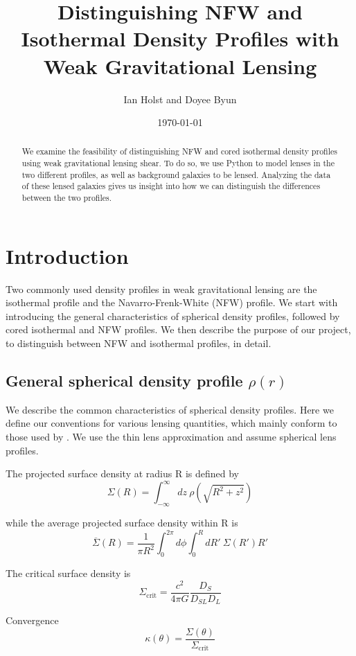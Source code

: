 \documentclass[10pt]{article}
\begin{document}
\title{Distinguishing NFW and Isothermal Density Profiles with Weak Gravitational Lensing}
\author{Ian Holst and Doyee Byun}
\date{\today}
\maketitle

\begin{abstract}
We examine the feasibility of distinguishing NFW and cored isothermal density profiles using weak gravitational lensing shear.
 To do so, we use Python to model lenses in the two different profiles, as well as background galaxies to be lensed.
 Analyzing the data of these lensed galaxies gives us insight into how we can distinguish the differences between the two profiles.
\end{abstract}

\section{Introduction}
Two commonly used density profiles in weak gravitational lensing are the isothermal profile and the Navarro-Frenk-White (NFW) profile.
We start with introducing the general characteristics of spherical density profiles, followed by cored isothermal and NFW profiles.
We then describe the purpose of our project, to distinguish between NFW and isothermal profiles, in detail.

\subsection{General spherical density profile $\rho(r)$}
We describe the common characteristics of spherical density profiles.
Here we define our conventions for various lensing quantities, which mainly conform to those used by \citet{Dodelson2017}. We use the thin lens approximation and assume spherical lens profiles.

The projected surface density at radius R is defined by
\[\Sigma(R) = \int_{-\infty}^{\infty}{dz\ \rho(\sqrt{R^2 + z^2})}\]

while the average projected surface density within R is
\[\overline{\Sigma}(R) = \frac{1}{\pi R^2} \int_0^{2\pi}{d\phi \int_0^{R}{dR'~\Sigma(R')R'}}\]

The critical surface density is
\[\Sigma_\mathrm{crit} = \frac{c^2}{4\pi G} \frac{D_S}{D_{SL} D_L}\]

Convergence
\[\kappa(\theta) = \frac{\Sigma(\theta)}{\Sigma_\mathrm{crit}}\]
\end{document}
